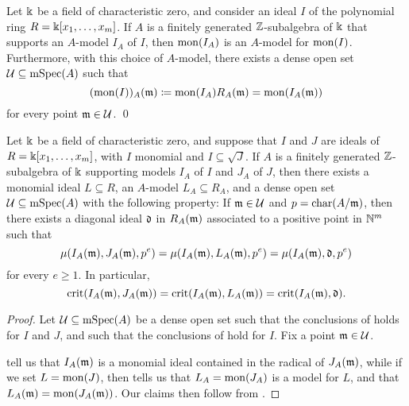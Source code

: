 \documentclass{amsart}
\begin{document}
\begin{theorem}
\label{mon-operation-modulo-p: T}
Let $\Bbbk$ be a field of characteristic zero, and consider an ideal $I$ of the polynomial ring $R=\Bbbk[x_1, \ldots, x_{m}]$.  If $A$ is a finitely generated $\mathbb{Z}$-subalgebra of $\Bbbk$ that supports an $A$-model $I_A$ of $I$, then $\operatorname{mon}(I_A)$ is an $A$-model for $\operatorname{mon}(I)$.  Furthermore, with this choice of $A$-model, there exists a dense open set $\mathcal{U} \subseteq \operatorname{mSpec}(A)$ such that
\[ (\operatorname{mon}(I))_A(\mathfrak{m}) \coloneqq \operatorname{mon}(I_A) R_A(\mathfrak{m}) = \operatorname{mon}(I_A(\mathfrak{m})) \] for every point $\mathfrak{m} \in \mathcal{U}$. \qed
\end{theorem}


\begin{corollary}
   \label{invariants associated to a monomial ideal in large characteristic: C}
   Let $\Bbbk$ be a field of characteristic zero, and suppose that $I$ and $J$ are ideals of  $R=\Bbbk[x_1, \ldots, x_m]$, with $I$ monomial and $I \subseteq \sqrt{J}$.
   If $A$ is a finitely generated $\mathbb{Z}$-subalgebra of $\Bbbk$ supporting models $I_A$ of $I$ and $J_A$ of $J$, then there exists a monomial ideal $L \subseteq R$, an $A$-model $L_A \subseteq R_A$, and a dense open set $\mathcal{U} \subseteq \operatorname{mSpec}(A)$ with the following property\textup:
   If $\mathfrak{m} \in \mathcal{U}$ and $p = \operatorname{char}(A/\mathfrak{m})$, then there exists a diagonal ideal $\mathfrak{d}$
   in $R_A(\mathfrak{m})$ associated to a positive point in $\mathbb{N}^m$ such that
   \[
      \mu(I_A(\mathfrak{m}), J_A(\mathfrak{m}), p^e) = \mu(I_A(\mathfrak{m}), L_A(\mathfrak{m}), p^e)  = \mu(I_A(\mathfrak{m}), \mathfrak{d}, p^e)
   \]
   for every $e \geq 1$.
   In particular,
   \[
      \operatorname{crit}(I_A(\mathfrak{m}), J_A(\mathfrak{m})) = \operatorname{crit}(I_A(\mathfrak{m}), L_A(\mathfrak{m}))= \operatorname{crit}(I_A(\mathfrak{m}), \mathfrak{d}).
   \]
\end{corollary}

\begin{proof}  Let $\mathcal{U} \subseteq \operatorname{mSpec}(A)$ be a dense open set such that the conclusions of  holds for $I$ and $J$, and such that the conclusions of  hold for $I$.  Fix a point $\mathfrak{m} \in \mathcal{U}$.

 tell us that $I_A(\mathfrak{m})$ is a monomial ideal contained in the radical of $J_A(\mathfrak{m})$, while if we set $L=\operatorname{mon}(J)$, then  tells us that $L_A = \operatorname{mon}(J_A)$ is a model for $L$, and that $L_A(\mathfrak{m}) = \operatorname{mon}(J_A(\mathfrak{m}))$.    Our claims then follow from .
\end{proof}
\end{document}
